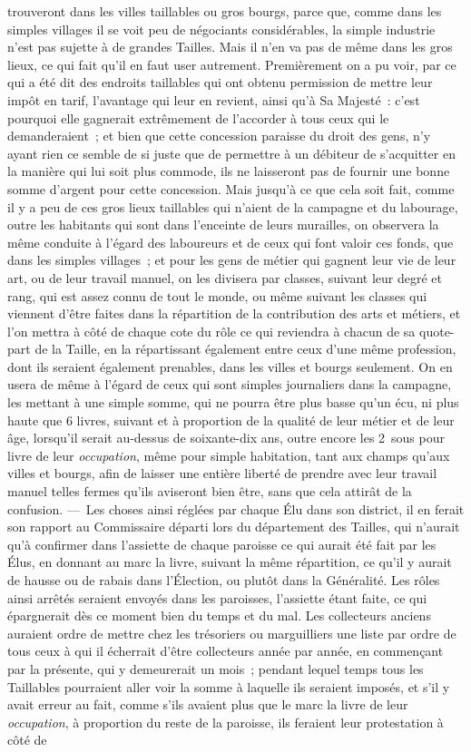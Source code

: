 \documentclass[french,twoside]{book} %
\begin{document}
trouveront dans les villes taillables ou gros bourgs, parce que, comme dans les simples villages il se voit peu de négociants considérables, la simple industrie n’est pas sujette à de grandes Tailles. Mais il n’en va pas de même dans les gros lieux, ce qui fait qu’il en faut user autrement. Premièrement on a pu voir, par ce qui a été dit des endroits taillables qui ont obtenu permission de mettre leur impôt en tarif, l’avantage qui leur en revient, ainsi qu’à Sa Majesté : c’est pourquoi elle gagnerait extrêmement de l’accorder à tous ceux qui le demanderaient ; et bien que cette concession paraisse du droit des gens, n’y ayant rien ce semble de si juste que de permettre à un débiteur de s’acquitter en la manière qui lui soit plus commode, ils ne laisseront pas de fournir une bonne somme d’argent pour cette concession. Mais jusqu’à ce que cela soit fait, comme il y a peu de ces gros lieux taillables qui n’aient de la campagne et du labourage, outre les habitants qui sont dans l’enceinte de leurs murailles, on observera la même conduite à l’égard des laboureurs et de ceux qui font valoir ces fonds, que dans les simples villages ; et pour les gens de métier qui gagnent leur vie de leur art, ou de leur travail manuel, on les divisera par classes, suivant leur degré et rang, qui est assez connu de tout le monde, ou même suivant les classes qui viennent d’être faites dans la répartition de la contribution des arts et métiers, et l’on mettra à côté de chaque cote du rôle ce qui reviendra à chacun de sa quote-part de la Taille, en la répartissant également entre ceux d’une même profession, dont ils seraient également prenables, dans les villes et bourgs seulement. On en usera de même à l’égard de ceux qui sont simples journaliers dans la campagne, les mettant à une simple somme, qui ne pourra être plus basse qu’un écu, ni plus haute que 6 livres, suivant et à proportion de la qualité de leur métier et de leur âge, lorsqu’il serait au-dessus de soixante-dix ans, outre encore les 2 sous pour livre de leur {\itshape occupation}, même pour simple habitation, tant aux champs qu’aux villes et bourgs, afin de laisser une entière liberté de prendre avec leur travail manuel telles fermes qu’ils aviseront bien être, sans que cela attirât de la confusion. — Les choses ainsi réglées par chaque Élu dans son district, il en ferait son rapport au Commissaire départi lors du département des Tailles, qui n’aurait qu’à confirmer dans l’assiette de chaque paroisse ce qui aurait été fait par les Élus, en donnant au marc la livre, suivant la même répartition, ce qu’il y aurait de hausse ou de rabais dans l’Élection, ou plutôt dans la Généralité. Les rôles ainsi arrêtés seraient envoyés dans les paroisses, l’assiette étant faite, ce qui épargnerait dès ce moment bien du temps et du mal. Les collecteurs anciens auraient ordre de mettre chez les trésoriers ou marguilliers une liste par ordre de tous ceux à qui il écherrait d’être collecteurs année par année, en commençant par la présente, qui y demeurerait un mois ; pendant lequel temps tous les Taillables pourraient aller voir la somme à laquelle ils seraient imposés, et s’il y avait erreur au fait, comme s’ils avaient plus que le marc la livre de leur {\itshape occupation}, à proportion du reste de la paroisse, ils feraient leur protestation à côté de 
\end{document}
